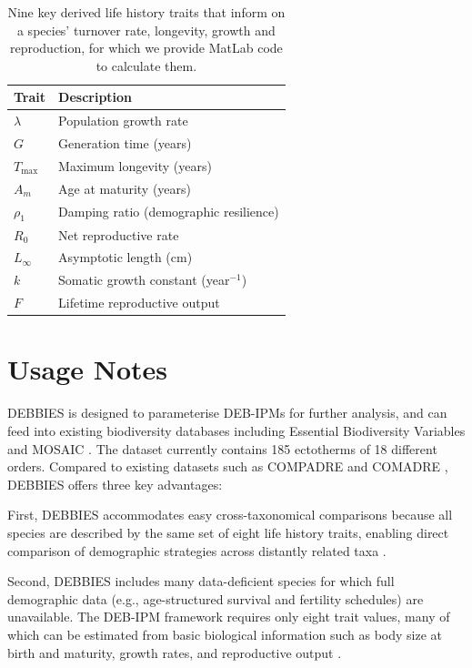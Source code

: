 \documentclass[11pt]{article}
\begin{document}
\begin{table}[htbp]
\centering
\caption{Nine key derived life history traits that inform on a species' turnover rate, longevity, growth and reproduction, for which we provide MatLab code to calculate them.}
\label{tab:derived}
\begin{tabular}{lp{8cm}}
\toprule
\textbf{Trait} & \textbf{Description} \\
\midrule
$\lambda$ & Population growth rate \\
$G$ & Generation time (years) \\
$T_{\max}$ & Maximum longevity (years) \\
$A_m$ & Age at maturity (years) \\
$\rho_1$ & Damping ratio (demographic resilience) \\
$R_0$ & Net reproductive rate \\
$L_{\infty}$ & Asymptotic length (cm) \\
$k$ & Somatic growth constant (year$^{-1}$) \\
$F$ & Lifetime reproductive output \\
\bottomrule
\end{tabular}
\end{table}

\section{Usage Notes}

DEBBIES is designed to parameterise DEB-IPMs for further analysis, and can feed into existing biodiversity databases including Essential Biodiversity Variables \citep{kissling2018} and MOSAIC \citep{maag2023}. The dataset currently contains 185 ectotherms of 18 different orders. Compared to existing datasets such as COMPADRE \citep{salguero2015} and COMADRE \citep{salguero2016b}, DEBBIES offers three key advantages:

First, DEBBIES accommodates easy cross-taxonomical comparisons because all species are described by the same set of eight life history traits, enabling direct comparison of demographic strategies across distantly related taxa \citep{bjorkvoll2020, healy2020, paniw2018}.

Second, DEBBIES includes many data-deficient species for which full demographic data (e.g., age-structured survival and fertility schedules) are unavailable. The DEB-IPM framework requires only eight trait values, many of which can be estimated from basic biological information such as body size at birth and maturity, growth rates, and reproductive output \citep{thorson2022, jabado2020}.
\end{document}
